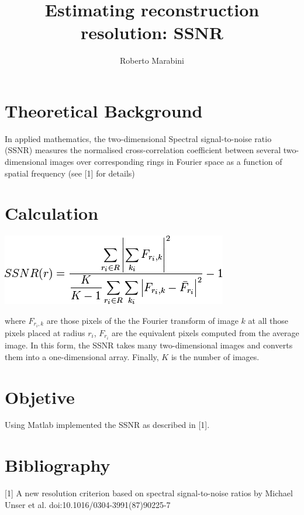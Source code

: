 \documentclass[a4paper,10pt]{article}
\title{Estimating reconstruction resolution: SSNR}
\author{Roberto Marabini}
\date{}
\begin{document}
\maketitle

\section{Theoretical Background}

In applied mathematics, the two-dimensional Spectral signal-to-noise ratio (SSNR) measures the normalised cross-correlation coefficient between several two-dimensional images over corresponding rings in Fourier space as a function of spatial frequency (see [1] for details)

\section {Calculation}

\includegraphics{ssnr.png}

\noindent where $F_{r_{i},k}$ are those pixels of the the Fourier transform of image $k$ at all those pixels placed at radius $r_i$, $F_{r_i}$ are the equivalent pixels computed from the average image. In this form, the SSNR takes many two-dimensional images and converts them into a one-dimensional array. Finally, $K$ is the number of images.

\section {Objetive}
Using Matlab implemented the SSNR as described in [1].

\section {Bibliography}
[1] A new resolution criterion based on spectral signal-to-noise ratios by Michael Unser et al. doi:10.1016/0304-3991(87)90225-7
\end{document}
